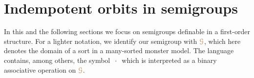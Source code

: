 \documentclass[creche.tex]{subfiles}
\begin{document}
\begin{comment}
\begin{proof}
We can assume that $\mrA$, $\mrB$ and $\mrC$ are $M$-orbits of elements of $\mrU$.
Say ${\mr a}$, ${\mr b}$, and ${\mr c}$ respectively.
As we are working over models,
we can assume that ${\mr a}\nonforkc_{\!A}{\mr b}$ and ${\mr a}{\cdot}{\mr b}\nonforkc_{\!A}{\mr c}$.
By Proposition~\ref{prop_orbits_main} the set on the l.h.s.\@ equals $\O({\mr a}{\cdot}{\mr b}{\cdot}{\mr c}/M)$.
By a similar argument the set on the r.h.s.\@ equals $\O({\mr a'}{\cdot}{\mr b'}{\cdot}{\mr c'}/M)$ for some elements ${\mr a'}$, ${\mr b'}$, and ${\mr c'}$.
Proposition~\ref{prop_semi_associative} proves that inclusion $\subseteq$ holds in general.
But inclusion between orbits amounts to equality.
\end{proof}

\begin{lemma}\label{lem_Hindman}
Let $M$ be a model and assume $\nonforkc_{\!M}$ is $1$-stationary.
If $\mrA$ is minimal among the  $M$-invariant,
idempotent,
type-definable sets then $\mrA=\O({\mr a}/M)$ for some element ${\mr a}$.
\end{lemma}
\begin{proof}
By Corollary~\ref{corol_min_idempotent},
for every ${\mr a}\in\mrA$ the set $\O({\mr a}/M)\cdot_{\!M}\mrA$ is idempotent.
It is also type-definable and contained in $\mrA$,
therefore by minimality $\O({\mr a}/M)\cdot_{\!M}\mrA=\mrA$.
Then there is a ${\mr b}\in\mrA$ such that ${\mr a}\nonforkc_M{\mr b}$ and ${\mr a}{\cdot}{\mr b}={\mr a}$.
By associativity, the set $\O({\mr a}/M)\cdot_{\!M}\O({\mr b}/M)$ is idempotent.
By Corollary~\ref{corol_orbits_associative},
it coincides with $\O({\mr a}/M)$.
The theorem follows by minimality.
\end{proof}
\end{comment}

\section{Indempotent orbits in semigroups}\label{semigroups}

\def\medrel#1{\parbox[t]{6ex}{$\displaystyle\hfil #1$}}
\def\ceq#1#2#3{\parbox[t]{22ex}{$\displaystyle #1$}\medrel{#2}{$\displaystyle #3$}}

In this and the following sections we focus on semigroups definable in a first-order structure.
For a lighter notation, we identify our semigroup with \emph{${\color{brown}\EuScript G}$},
which here denotes the domain of a sort in a many-sorted monster model.
The language contains, among others,
the symbol \emph{$\ \cdot\ $} which is interpreted as a binary associative operation on ${\color{brown}\EuScript G}$.
\end{document}
